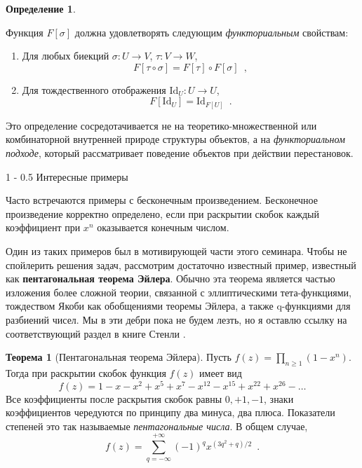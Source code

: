 \documentclass[a5paper]{article}
\makeatletter
\theoremstyle{definition}
\newtheorem*{theorem}{Теорема}
\newtheorem*{definition}{Определение}
\renewcommand{\section}{\@startsection
{section}%
{1}%
{\z@}%
{-\baselineskip}%
{0.5\baselineskip}%
{\centering\large\scshape}} %
\makeatother
\begin{document}
\begin{enumerate}
\begin{definition}
\begin{enumerate}
		 	Функция \( F[\sigma] \) должна удовлетворять следующим 
		 	\textit{функториальным} свойствам:
		 	\begin{enumerate}
			 	\item Для любых биекций \( \sigma \colon U \to V \), \( \tau 
			 	\colon V \to W \),
			 	\[
			 		F[\tau \circ \sigma] = F[\tau] \circ F[\sigma] \enspace ,
			 	\]
			 	\item Для тождественного отображения \( \mathrm{Id}_{U} \colon 
			 	U \to U 
			 	\),
			 	\[
			 		F[\mathrm{Id}_{U}] = \mathrm{Id}_{F[U]} \enspace .
			 	\]
		 	\end{enumerate}
	 	\end{enumerate}
	\end{definition}
	Это определение сосредотачивается не на теоретико-множественной или 
	комбинаторной внутренней природе структуры объектов, а на 
	\textit{функториальном подходе}, который рассматривает поведение объектов 
	при действии перестановок.
\end{enumerate}

\section{Интересные примеры}

Часто встречаются примеры с бесконечным произведением. Бесконечное произведение 
корректно определено, если при раскрытии скобок каждый коэффициент при \( x^n 
\) оказывается конечным числом.

Один из таких примеров был в мотивирующей части этого семинара. Чтобы не 
спойлерить решения задач, рассмотрим достаточно известный пример, известный как 
\textbf{пентагональная 
теорема Эйлера}. Обычно эта теорема является частью изложения более сложной 
теории, связанной с эллиптическими тета-функциями, тождеством Якоби как 
обобщениями теоремы Эйлера, а также q-функциями для разбиений чисел. Мы в эти 
дебри пока не будем лезть, но я оставлю ссылку на соответствующий раздел в 
книге Стенли \cite[Section 1.8]{stanley1}.

\begin{theorem}[Пентагональная теорема Эйлера]
	Пусть \( f(z) = \prod_{n \geq 1}(1 - x^n) \). Тогда при раскрытии скобок 
	функция \( f(z) \) имеет вид
	\[
		f(z) = 1 - x - x^2 + x^5 + x^7 - x^{12} - x^{15} + x^{22} + x^{26} - 
		\ldots
	\]
	Все коэффициенты после раскрытия скобок равны \( 0, +1, -1 \), знаки 
	коэффициентов чередуются по принципу два минуса, два плюса. Показатели 
	степеней это так называемые \textit{пентагональные числа}. В общем случае,
	\[
		f(z) = \sum_{q = -\infty}^{+\infty} (-1)^{q} x^{(3q^2+q)/2} \enspace .
	\]
\end{theorem}
\end{document}
